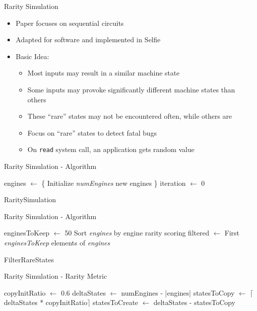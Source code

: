 \documentclass[10pt]{beamer}
\begin{document}
\begin{frame}{Rarity Simulation}
	\begin{itemize}
		\item Paper focuses on sequential circuits
		\item Adapted for software and implemented in Selfie
		\item Basic Idea:
		\begin{itemize}
			\item Most inputs may result in a similar machine state
			\item Some inputs may provoke significantly different machine states than others
			\item These \enquote{rare} states may not be encountered often, while others are
			\item Focus on \enquote{rare} states to detect fatal bugs
			\item On \texttt{read} system call, an application gets random value
		\end{itemize}
	\end{itemize}
\end{frame}

\begin{frame}{Rarity Simulation - Algorithm}
	\begin{algorithm}[H]
		\SetAlgoLined
		engines $\gets$ \{ Initialize \textit{numEngines} new engines \}\;
		iteration $\gets$ 0\;
		\caption{RaritySimulation}
	\end{algorithm}
\end{frame}

\begin{frame}{Rarity Simulation - Algorithm}
		\begin{algorithm}[H]
		\SetAlgoLined
		enginesToKeep $\gets$ 50\;
		Sort \textit{engines} by engine rarity scoring\;
		filtered $\gets$ First \textit{enginesToKeep} elements of \textit{engines}\;
		\caption{FilterRareStates}
	\end{algorithm}
\end{frame}

\begin{frame}{Rarity Simulation - Rarity Metric}
	\begin{algorithm}[H]
		\SetAlgoLined
		copyInitRatio $\gets$ 0.6\;
		deltaStates $\gets$ numEngines - |engines|\;
		statesToCopy $\gets$ $\lceil$deltaStates * copyInitRatio$\rceil$\;
		statesToCreate $\gets$ deltaStates - statesToCopy\;

	\end{algorithm}
\end{frame}
\end{document}
